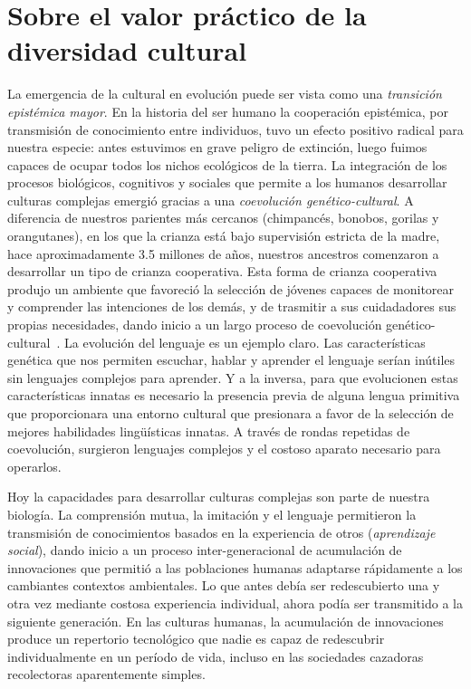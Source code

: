 \documentclass[a4paper,11pt]{book}
\theoremstyle{definition}
\begin{document}
\section{Sobre el valor pr\'actico de la diversidad cultural}


La emergencia de la cultural en evoluci\'on puede ser vista como una \emph{transici\'on epist\'emica mayor}.
%
En la historia del ser humano la cooperaci\'on epist\'emica, por transmisi\'on de conocimiento entre individuos, tuvo un efecto positivo radical para nuestra especie: antes estuvimos en grave peligro de extinci\'on, luego fuimos capaces de ocupar todos los nichos ecol\'ogicos de la tierra.
%
La integraci\'on de los procesos biol\'ogicos, cognitivos y sociales que permite a los humanos desarrollar culturas complejas emergi\'o gracias a una \emph{coevoluci\'on gen\'etico-cultural}.
%
A diferencia de nuestros parientes m\'as cercanos (chimpanc\'es, bonobos, gorilas y orangutanes), en los que la crianza est\'a bajo supervisi\'on estricta de la madre, hace aproximadamente 3.5 millones de a\~nos, nuestros ancestros comenzaron a desarrollar un tipo de crianza cooperativa.
%
Esta forma de crianza cooperativa produjo un ambiente que favoreci\'o la selecci\'on de j\'ovenes capaces de monitorear y comprender las intenciones de los dem\'as, y de trasmitir a sus cuidadadores sus propias necesidades, dando inicio a un largo proceso de coevoluci\'on gen\'etico-cultural~\cite{Hardy2020}.
%
La evoluci\'on del lenguaje es un ejemplo claro.
%
Las caracter\'isticas gen\'etica que nos permiten escuchar, hablar y aprender el lenguaje ser\'ian in\'utiles sin lenguajes complejos para aprender.
%
Y a la inversa, para que evolucionen estas caracter\'isticas innatas es necesario la presencia previa de alguna lengua primitiva que proporcionara una entorno cultural que presionara a favor de la selecci\'on de mejores habilidades ling\"u\'isticas innatas.
%
A trav\'es de rondas repetidas de coevoluci\'on, surgieron lenguajes complejos y el costoso aparato necesario para operarlos.


Hoy la capacidades para desarrollar culturas complejas son parte de nuestra biolog\'ia.
%
La comprensi\'on mutua, la imitaci\'on y el lenguaje permitieron la transmisi\'on de conocimientos basados en la experiencia de otros (\emph{aprendizaje social}), dando inicio a un proceso inter-generacional de acumulaci\'on de innovaciones que permiti\'o a las poblaciones humanas adaptarse r\'apidamente a los cambiantes contextos ambientales.
%
Lo que antes deb\'ia ser redescubierto una y otra vez mediante costosa experiencia individual, ahora pod\'ia ser transmitido a la siguiente generaci\'on.
%
En las culturas humanas, la acumulaci\'on de innovaciones produce un repertorio tecnol\'ogico que nadie es capaz de redescubrir individualmente en un per\'iodo de vida, incluso en las sociedades cazadoras recolectoras aparentemente simples.
\end{document}
